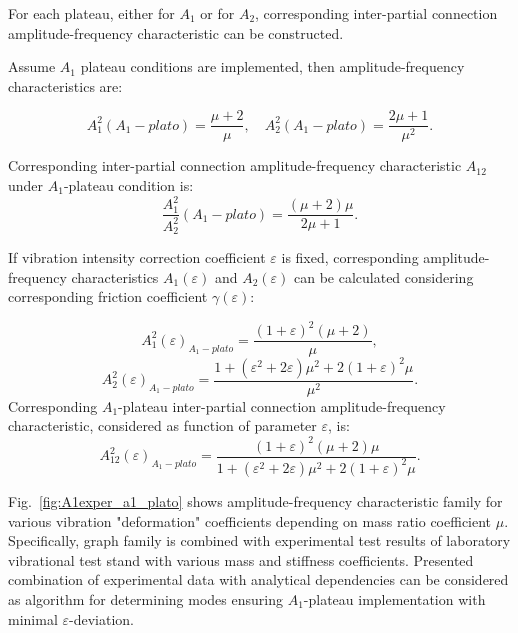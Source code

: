 \documentclass[12pt, a4paper]{article}
\begin{document}
	
	For each plateau, either for $A_1$ or for $A_2$, corresponding inter-partial connection amplitude-frequency characteristic can be constructed. 
	
	Assume $A_1$ plateau conditions are implemented, then amplitude-frequency characteristics are:
	
	\begin{equation}
		A^2_1(A_1-plato) = \frac{\mu  +2}{\mu }, 	 \quad 	A^2_2(A_1-plato) = \frac{2 \mu  +1}{\mu^{2}}.
	\end{equation}
	
	Corresponding inter-partial connection amplitude-frequency characteristic $A_{12}$ under $A_1$-plateau condition is:
	\begin{equation}
		\frac{A^2_1}{A^2_2}(A_1-plato)=\frac{(\mu+2)\mu}{2 \mu  +1 }.
	\end{equation}
	
	If vibration intensity correction coefficient $\varepsilon$ is fixed, corresponding amplitude-frequency characteristics $A_1(\varepsilon)$ and $A_2(\varepsilon)$ can be calculated considering corresponding friction coefficient $\gamma(\varepsilon)$:
	
	\begin{equation}
		A^2_1(\varepsilon)_{A_{1}-plato} = 
		\frac{\left(1+\varepsilon \right)^2 \left(\mu  +2\right)}{\mu} ,
	\end{equation}
	\begin{equation}
		A^2_2(\varepsilon)_{A_{1}-plato} = 
		\frac{1+\left(\varepsilon^{2}+2 \varepsilon\right) \mu^{2}+2 \left(1+\varepsilon\right)^{2} \mu}{\mu^{2}}.
	\end{equation}
	Corresponding $A_1$-plateau inter-partial connection amplitude-frequency characteristic, considered as function of parameter $\varepsilon$, is:
	\begin{equation} 
		{A_{12}^2} \! (\varepsilon)_{A_{1}-plato} = 
		\frac{\left(1+\varepsilon\right)^{2}\left(\mu+2\right)\mu}{1+\left(\varepsilon^{2}+2 \varepsilon \right) \mu^{2}+2 \left(1+\varepsilon\right)^{2} \mu}.
	\end{equation}	
	
	Fig.~\ref{fig:A1exper_a1_plato} shows amplitude-frequency characteristic family for various vibration "deformation" coefficients depending on mass ratio coefficient $\mu$. Specifically, graph family is combined with experimental test results of laboratory vibrational test stand with various mass and stiffness coefficients. Presented combination of experimental data with analytical dependencies can be considered as algorithm for determining modes ensuring $A_{1}$-plateau implementation with minimal $\varepsilon$-deviation.
	
\end{document}

